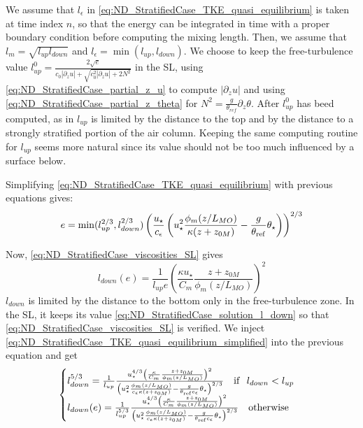 We assume that $l_\epsilon$ in
\eqref{eq:ND_StratifiedCase_TKE_quasi_equilibrium} is taken at
time index $n$, so that the energy can be integrated in time
with a proper boundary condition before computing the mixing
length. Then, we assume that $l_m = \sqrt{l_{up}l_{down}}$ and
$l_\epsilon = \min(l_{up}, l_{down})$.
We choose to keep the free-turbulence value
$l_{up}^0 = \frac{2\sqrt{e}}
{c_0|\partial_z u| + \sqrt{c_0^2 |\partial_z u| + 2N^2}}$
in the SL, using \eqref{eq:ND_StratifiedCase_partial_z_u}
to compute $|\partial_z u|$ and using
\eqref{eq:ND_StratifiedCase_partial_z_theta}
for $N^2 = \frac{g}{\theta_{ref}}\partial_z \theta$.
After $l_{up}^0$ has beed computed, as in
\cite{lemarie2021gmd} $l_{up}$ is limited by
the distance to the top and by the distance to a strongly
stratified portion of the air column.
Keeping the same computing routine for $l_{up}$ seems
more natural since its value should not be too much
influenced by a surface below.
\par
Simplifying \eqref{eq:ND_StratifiedCase_TKE_quasi_equilibrium}
with previous equations gives:
\begin{equation}
	\label{eq:ND_StratifiedCase_TKE_quasi_equilibrium_simplified}
	e = \min(l_{up}^{2/3}, l_{down}^{2/3})\left(
	\frac{u_\star}{c_\epsilon} 
	\left({u}_\star^2
	\frac{\phi_m(z/L_{MO})}{\kappa (z+z_{0M})}
	- \frac{g}{\theta_{\rm ref}}\theta_\star
	\right)
	\right)^{2/3}
\end{equation}

Now, \eqref{eq:ND_StratifiedCase_viscosities_SL} gives
\begin{equation}
	\label{eq:ND_StratifiedCase_solution_l_down}
	l_{down}(e) = \frac{1}{l_{up} e} \left(
	\frac{\kappa u_\star}{C_m}
	\frac{z + z_{0M}}{\phi_m(z/L_{MO})}
\right)^2
\end{equation}
$l_{down}$ is limited by the distance to the bottom only
in the free-turbulence zone. In the SL, it keeps its value
\eqref{eq:ND_StratifiedCase_solution_l_down}
so that \eqref{eq:ND_StratifiedCase_viscosities_SL} is
verified.
We inject \eqref{eq:ND_StratifiedCase_TKE_quasi_equilibrium_simplified}
into the previous equation and get
\begin{equation}
	\label{eq:ND_StratifiedCase_solution_l_down}
	\begin{cases}
	l_{down}^{5/3} = \frac{1}{l_{up}} \frac{u_\star^{4/3}\left(
	\frac{\kappa}{C_m}
	\frac{z + z_{0M}}{\phi_m(z/L_{MO})}
	\right)^2}{
	\left({u}_\star^2
	\frac{\phi_m(z/L_{MO})}{c_\epsilon\kappa (z+z_{0M})}
	- \frac{g}{\theta_{\rm ref}c_\epsilon}\theta_\star
	\right)^{2/3}} ~~~ {\rm if } ~~l_{down} < l_{up}\\
	l_{down}(e) = \frac{1}{l_{up}^{5/3}} \frac{u_\star^{4/3}\left(
	\frac{\kappa}{C_m}
	\frac{z + z_{0M}}{\phi_m(z/L_{MO})}
	\right)^2}{
	\left({u}_\star^2
	\frac{\phi_m(z/L_{MO})}{c_\epsilon\kappa (z+z_{0M})}
	- \frac{g}{\theta_{\rm ref}c_\epsilon}\theta_\star
	\right)^{2/3}} ~~~ {\rm otherwise}\\
	\end{cases}
\end{equation}

